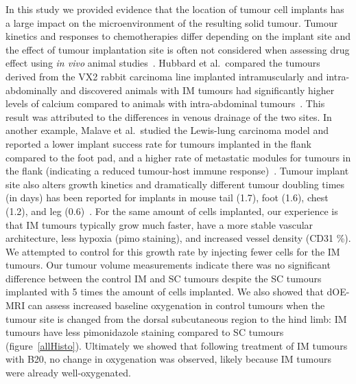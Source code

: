 In this study we provided evidence that the location of tumour cell implants has a large impact on the microenvironment of the resulting solid tumour.
Tumour kinetics and responses to chemotherapies differ depending on the implant site and the effect of tumour implantation site is often not considered when assessing drug effect using \emph{in vivo} animal studies~\cite{Arjona:2006ch}.
Hubbard et al.\ compared the tumours derived from the VX2 rabbit carcinoma line implanted intramuscularly and intra-abdominally and discovered animals with \acs{IM} tumours had significantly higher levels of calcium compared to animals with intra-abdominal tumours~\cite{Hubbard:1980vf}.
This result was attributed to the differences in venous drainage of the two sites.
In another example, Malave et al.\ studied the Lewis-lung carcinoma model and reported a lower implant success rate for tumours implanted in the flank compared to the foot pad, and a higher rate of metastatic modules for tumours in the flank (indicating a reduced tumour-host immune response)~\cite{Malave:1979ui}.
Tumour implant site also alters growth kinetics and dramatically different tumour doubling times (in days) has been reported for implants in mouse tail (1.7), foot (1.6), chest (1.2), and leg (0.6)~\cite{Hill:1982ci}.
For the same amount of cells implanted, our experience is that \acs{IM} tumours typically grow much faster, have a more stable vascular architecture, less hypoxia (pimo staining), and increased vessel density (CD31 \%).
We attempted to control for this growth rate by injecting fewer cells for the \acs{IM} tumours. 
Our tumour volume measurements indicate there was no significant difference between the control \acs{IM} and \acs{SC} tumours despite the \acs{SC} tumours implanted with 5 times the amount of cells implanted.
We also showed that \acs{dOE-MRI} can assess increased baseline oxygenation in control tumours when the tumour site is changed from the dorsal subcutaneous region to the hind limb: \acs{IM} tumours have less pimonidazole staining compared to \acs{SC} tumours (figure~\ref{allHisto}).
Ultimately we showed that following treatment of \acs{IM} tumours with B20, no change in oxygenation was observed, likely because \acs{IM} tumours were already well-oxygenated.

